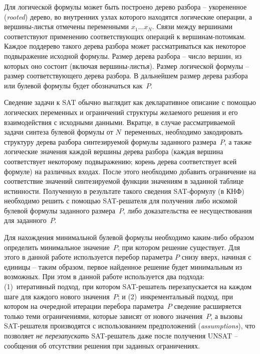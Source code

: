 Для логической формулы может быть построено дерево разбора \--- укорененное (\textit{rooted}) дерево, во внутренних узлах которого находятся логические операции, а вершины-листья отмечены переменными $x_{1}\ldots x_{N}$.
Связи между вершинами соответствуют применению соответствующих операций к вершинам-потомкам.
Каждое поддерево такого дерева разбора может рассматриваться как некоторое подвыражение исходной формулы.
Размер дерева разбора \--- число вершин, из которых оно состоит (включая вершины-листья).
Размер логической формулы \--- размер соответствующего дерева разбора.
В дальнейшем размер дерева разбора или булевой формулы будет обозначаться как~$P$.

Сведение задачи к SAT обычно выглядит как декларативное описание с помощью логических переменных и ограничений структуры желаемого решения и его взаимодействия с исходными данными.
Вкратце, в случае рассматриваемой задачи синтеза булевой формулы от $N$~переменных, необходимо закодировать структуру дерева разбора синтезируемой формулы заданного размера~$P$, а также логические значения каждой вершины дерева разбора (каждая вершина соответствует некоторому подвыражению; корень дерева соответствует всей формуле) на различных входах.
После этого необходимо добавить ограничение на соответствие значений синтезируемой функции значениям в заданной таблице истинности.
Полученную в результате такого сведения SAT-формулу (в КНФ) необходимо решить с помощью SAT-решателя для получения либо искомой булевой формулы заданного размера~$P$, либо доказательства ее несуществования для заданного~$P$.

Для нахождения минимальной булевой формулы необходимо каким-либо образом определить минимальное значение~$P$, при котором решение существует.
Для этого в данной работе используется перебор параметра $P$ снизу вверх, начиная с единицы \--- таким образом, первое найденное решение будет минимальным из возможных.
При этом в данной работе используется два подхода: (1)~итеративный подход, при котором SAT-решатель перезапускается на каждом шаге для каждого нового значения~$P$; и (2)~инкрементальный подход, при котором на очередной итерации перебора параметра~$P$ сведение расширяется только теми ограничениями, которые зависят от нового значения~$P$, а вызовы SAT-решателя производятся с использованием предположений (\textit{assumptions}), что позволяет \emph{не перезапускать} SAT-решатель даже после получения UNSAT \--- сообщения об отсутствии решения при заданных ограничениях.

